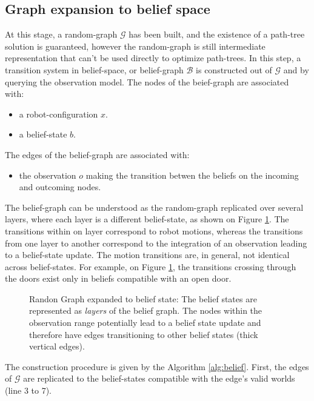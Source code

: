 \documentclass[letterpaper, 10 pt, conference]{ieeeconf}  %
\begin{document}
\subsection{Graph expansion to belief space}
\label{section:graph_expansion_belief_space}
At this stage, a random-graph $\mathcal{G}$ has been built, and the existence of a path-tree solution is guaranteed, however the random-graph is still intermediate representation that can't be used directly to optimize path-trees. In this step, a transition system in belief-space, or belief-graph $\mathcal{B}$ is constructed out of $\mathcal{G}$ and by querying the observation model. 
The nodes of the beief-graph are associated with:
\begin{itemize}
\item a robot-configuration $x$.
\item a belief-state $b$.
\end{itemize}
The edges of the belief-graph are associated with:
\begin{itemize}
\item the observation $o$ making the transition betwen the beliefs on the incoming and outcoming nodes.
\end{itemize}
The belief-graph can be understood as the random-graph replicated over several layers, where each layer is a different belief-state, as shown on Figure \ref{fig:belief_layers}. The transitions within on layer correspond to robot motions, whereas the transitions from one layer to another correspond to the integration of an observation leading to a belief-state update. The motion transitions are, in general, not identical across belief-states. For example, on Figure \ref{fig:belief_layers}, the transitions crossing through the doors exist only in beliefs compatible with an open door.
  
\begin{figure}[!htb]
 \caption{Randon Graph expanded to belief state: The belief states are represented as \textit{layers} of the belief graph. The nodes within the observation range potentially lead to a belief state update and therefore have edges transitioning to other belief states (thick vertical edges).}
 \label{fig:belief_layers}
\end{figure}

The construction procedure is given by the Algorithm \ref{alg:belief}. First, the edges of $\mathcal{G}$ are replicated to the belief-states compatible with the edge's valid worlds (line 3 to 7).
\end{document}

